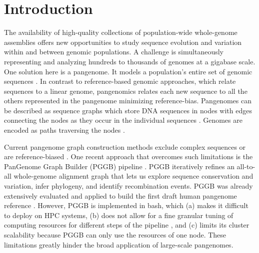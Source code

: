 \documentclass{bioinfo}
\theoremstyle{definition}
\begin{document}
	\section{Introduction}
	The availability of high-quality collections of population-wide whole-genome assemblies \citep{Liao2023, Kang2023, Weller2023, Zhou2022, Liu2020, Leonard2022} offers new opportunities to study sequence evolution and variation within and between genomic populations. 
	A challenge is simultaneously representing and analyzing hundreds to thousands of genomes at a gigabase scale. 
	One solution here is a pangenome. It models a population's entire set of genomic sequences \citep{Ballouz2019}. 
	In contrast to reference-based genomic approaches, which relate sequences to a linear genome, pangenomics relates each new sequence to all the others represented in the pangenome \citep{CompPan2016, Eizenga_2020, Sherman_2020} minimizing reference-bias. 
	Pangenomes can be described as sequence graphs which store DNA sequences in nodes with edges connecting the nodes as they occur in the individual sequences \citep{Hein1989}. 
	Genomes are encoded as paths traversing the nodes \citep{Garrison:2018}.
	
	Current pangenome graph construction methods exclude complex sequences or are reference-biased \citep{Chin2023, Minkin2016}.
	One recent approach that overcomes such limitations is the PanGenome Graph Builder (PGGB) pipeline \citep{Garrison2023}. 
	PGGB iteratively refines an all-to-all whole-genome alignment graph that lets us explore sequence conservation and variation, infer phylogeny, and identify recombination events. 
	PGGB was already extensively evaluated \citep{Garrison2023, Andreace2023} and applied to build the first draft human pangenome reference \citep{Liao2023}.
	However, PGGB is implemented in bash, which (a) makes it difficult to deploy on HPC systems, (b) does not allow for a fine granular tuning of computing resources for different steps of the pipeline \citep{Sztuka2024}, and (c) limits its cluster scalability because PGGB can only use the resources of one node. These limitations greatly hinder the broad application of large-scale pangenomes.
	
\end{document}

